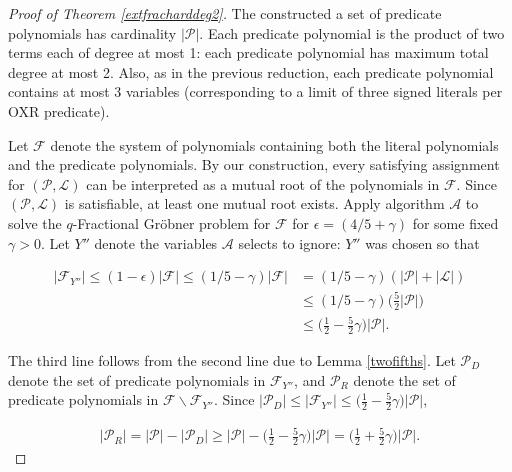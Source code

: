 \documentclass{article}
\newcommand{\ep}[0]{\epsilon}
\begin{document}
\begin{proof}[Proof of Theorem \ref{extfracharddeg2}]
The constructed a set of predicate polynomials has cardinality $|\mathcal{P}|$.
Each predicate polynomial is the product of two terms each of degree at most 1: each predicate polynomial has maximum total degree at most 2. Also, as in the previous reduction, each predicate polynomial contains at most 3 variables (corresponding to a limit of three signed literals per OXR predicate).

Let $\mathcal{F}$ denote the system of polynomials containing both the literal polynomials and the predicate polynomials. By our construction, every satisfying assignment for $(\mathcal{P},\mathcal{L})$ can be interpreted as a mutual root of the polynomials in $\mathcal{F}$. 
Since $(\mathcal{P},\mathcal{L})$ is satisfiable, at least one mutual root exists. Apply algorithm $\mathcal{A}$ to solve the $q$\nobreakdash-Fractional Gr\"{o}bner problem for $\mathcal{F}$ for $\ep=(4/5+\gamma)$ for some fixed $\gamma>0$. Let $Y''$ denote the variables $\mathcal{A}$ selects to ignore: $Y''$ was chosen so that

\vspace{-5mm}

\begin{align*}
|\mathcal{F}_{Y''}|\leq (1-\ep)|\mathcal{F}|\leq (1/5-\gamma)|\mathcal{F}|&= (1/5-\gamma)(|\mathcal{P}|+|\mathcal{L}|)\\
&\leq (1/5-\gamma)\Big(\frac{5}{2}|\mathcal{P}|\Big)\\
&\leq \Big(\frac{1}{2}-\frac{5}{2}\gamma\Big)|\mathcal{P}|.
\end{align*}

\noindent The third line follows from the second line due to Lemma \ref{twofifths}. Let $\mathcal{P}_D$ denote the set of predicate polynomials in $\mathcal{F}_{Y''}$, and $\mathcal{P}_R$ denote the set of predicate polynomials in $\mathcal{F}\backslash\mathcal{F}_{Y''}$. Since $|\mathcal{P}_D|\leq |\mathcal{F}_{Y''}|\leq \Big(\frac{1}{2}-\frac{5}{2}\gamma\Big)|\mathcal{P}|$,



\begin{align}\label{half}
|\mathcal{P}_R|= |\mathcal{P}|- |\mathcal{P}_D| \geq |\mathcal{P}|- \Big(\frac{1}{2}-\frac{5}{2}\gamma\Big)|\mathcal{P}|= \Big(\frac{1}{2}+\frac{5}{2}\gamma\Big)|\mathcal{P}|.
\end{align}




\end{proof}
\end{document}
